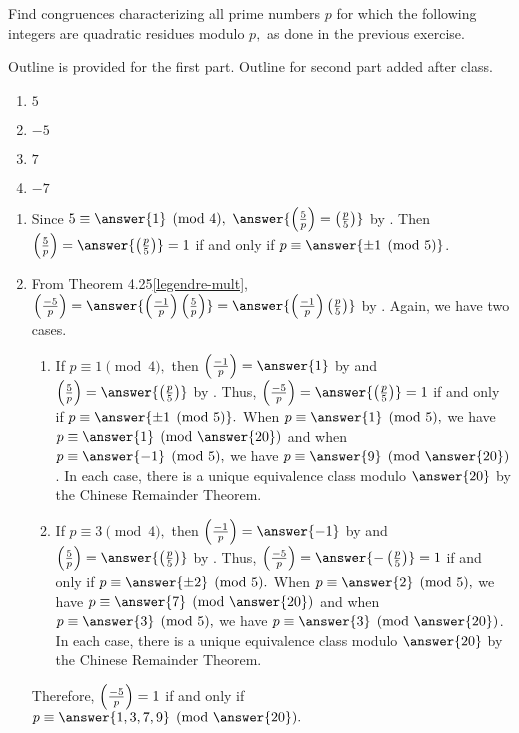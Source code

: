 \documentclass{ximera}
\begin{document}
\begin{br}
	Find congruences characterizing all prime numbers $p$ for which the following integers are quadratic residues modulo $p,$ as done in the previous exercise. 
	
	Outline is provided for the first part. Outline for second part added after class.
	\begin{enumerate}[label=(\alph*)]
		\item $5$ 
		\item $-5$	
		\item $7$ 
		\item $-7$	
	\end{enumerate}
\end{br}

\begin{solution}
 	\begin{enumerate}[label=(\alph*)]
		\item Since $5\equiv\answer{1}\pmod{4},$ $\answer{\legendre{5}{p}=\legendre{p}{5}}$ by . Then $\legendre{5}{p}=\answer{\legendre{p}{5}}=1$ if and only if $p\equiv\answer{ \pm1\pmod{5}}$.

		\item From Theorem 4.25\ref{legendre-mult}, $\legendre{-5}{p}= \answer{\legendre{-1}{p}\legendre{5}{p}}=\answer{\legendre{-1}{p}\legendre{p}{5}}$ by . Again, we have two cases.
			
			\begin{enumerate}[label=(\roman*)]
 				\item If $p\equiv 1\pmod{4},$ then $\legendre{-1}{p}=\answer{1}$ by  and
				$\legendre{5}{p}=\answer{\legendre{p}{5}}$ by . Thus, $\legendre{-5}{p}=\answer{\legendre{p}{5}}=1$ if and only if $p\equiv \answer{\pm1\pmod{5}}.$ When $p\equiv \answer{1}\pmod{5},$ we have $p\equiv\answer{1}\pmod{\answer{20}}$ and when $p\equiv \answer{-1}\pmod{5},$ we have $p\equiv\answer{9}\pmod{\answer{20}}$. In each case, there is a unique equivalence class modulo $\answer{20}$ by the Chinese Remainder Theorem.
		
		\item If $p\equiv 3\pmod{4},$ then $\legendre{-1}{p}=\answer{-1}$ by  and
				$\legendre{5}{p}=\answer{\legendre{p}{5}}$ by . Thus, $\legendre{-5}{p}=\answer{-\legendre{p}{5}}=1$ if and only if $p\equiv \answer{\pm 2}\pmod{5}.$ When $p\equiv \answer{2}\pmod{5},$ we have $p\equiv\answer{7}\pmod{\answer{20}}$ and when $p\equiv \answer{3}\pmod{5},$ we have $p\equiv\answer{3}\pmod{\answer{20}}$. In each case, there is a unique equivalence class modulo $\answer{20}$ by the Chinese Remainder Theorem.
	\end{enumerate}
	Therefore, $\left(\frac{-5}{p}\right)=1$ if and only if $p\equiv \answer{1,3,7,9}\pmod{\answer{20}}.$\qedhere
	\end{enumerate}
\end{solution}
\end{document}
